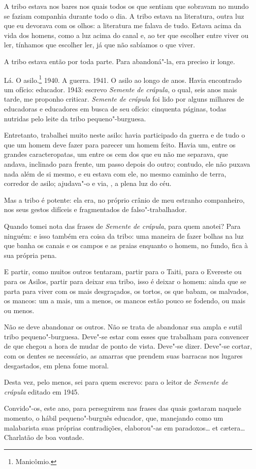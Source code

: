 A tribo estava nos bares nos quais todos os que sentiam que sobravam no
mundo se faziam companhia durante todo o dia. A tribo estava na
literatura, outra luz que eu devorava com os olhos: a literatura me
falava de tudo. Estava acima da vida dos homens, como a luz acima do
canal e, ao ter que escolher entre viver ou ler, tínhamos que escolher
ler, já que não sabíamos o que viver.

A tribo estava então por toda parte. Para abandoná"-la, era preciso ir
longe.

Lá. O asilo.\footnote{Manicômio.} 1940. A guerra. 1941. O asilo ao longo
de anos. Havia encontrado um ofício: educador. 1943: escrevo
\emph{Semente de crápula}, o qual, seis anos mais tarde, me proponho
criticar. \emph{Semente de crápula} foi lido por alguns milhares de
educadoras e educadores em busca de seu ofício: cinquenta páginas, todas
nutridas pelo leite da tribo pequeno"-burguesa.

Entretanto, trabalhei muito
neste asilo: havia participado da guerra e de tudo o que um homem deve
fazer para parecer um homem feito. Havia um, entre os grandes
caracteropatas, um entre os cem dos que eu não me separava, que andava,
inclinado para frente, um passo depois do outro; contudo, ele não puxava
nada além de si mesmo, e eu estava com ele, no mesmo caminho de terra,
corredor de asilo; ajudava"-o e via, , a plena luz do céu.

Mas a tribo é potente: ela era, no próprio crânio de meu estranho
companheiro, nos seus gestos difíceis e fragmentados de
falso"-trabalhador.

Quando tomei nota das frases de \emph{Semente de crápula}, para quem
anotei? Para ninguém: e isso também era coisa da tribo: uma maneira de
fazer bolhas na luz que banha os canais e os campos e as praias enquanto
o homem, no fundo, fica à sua própria pena.

E partir, como muitos outros tentaram, partir para o Taiti, para o
Evereste ou para os Asilos, partir para deixar sua tribo, isso é deixar
o homem: ainda que se parta para viver com os mais desgraçados, os
tortos, os que babam, os malvados, os mancos: um a mais, um a menos, os
mancos estão pouco se fodendo, ou mais ou menos.

Não se deve abandonar os outros. Não se trata de abandonar sua ampla e
sutil tribo pequeno"-burguesa. Deve"-se estar com esses que trabalham para
convencer de que chegou a hora de mudar de ponto de vista. Deve"-se
dizer. Deve"-se cortar, com os dentes se necessário, as amarras que
prendem suas barracas nos lugares desgastados, em plena fome moral.

Desta vez, pelo menos, sei para quem escrevo: para o leitor de
\emph{Semente de crápula} editado em 1945.

Convido"-os, este ano, para perseguirem nas frases das quais gostaram
naquele momento, o hábil pequeno"-burguês educador, que, manejando como
um malabarista suas próprias contradições, elaborou"-as em paradoxos\ldots{}
et cætera\ldots{} Charlatão de boa vontade.
